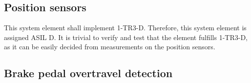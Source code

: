 %
%
%
\subsection{Position sensors}
This system element shall implement 1-TR3-D.
Therefore, this system element is assigned ASIL D.
It is trivial to verify and test that the element fulfills 1-TR3-D, as it can be easily decided from measurements on the position sensors.

\subsection{Brake pedal overtravel detection}
